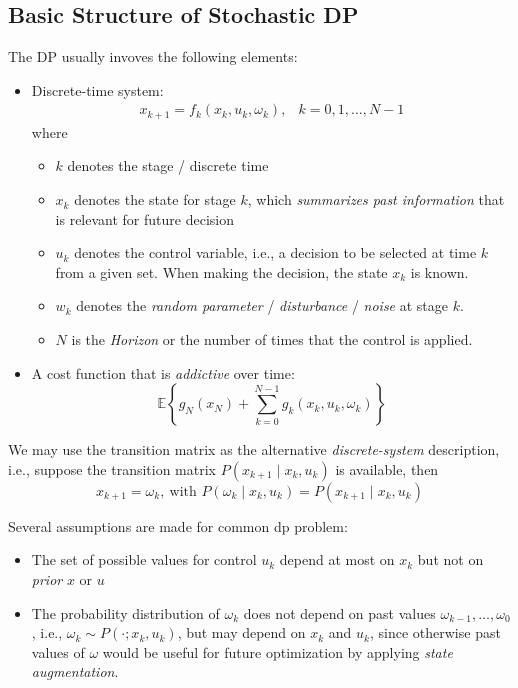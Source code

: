 \subsection{Basic Structure of Stochastic DP}
The DP usually invoves the following elements:
\begin{itemize}
\item
Discrete-time system:
\[
\begin{array}{ll}
x_{k+1} = f_k(x_k,u_k,\omega_k),&k=0,1,\dots,N-1
\end{array}
\]
where
\begin{itemize}
\item
$k$ denotes the stage / discrete time
\item
$x_k$ denotes the state for stage $k$, which \emph{summarizes past information} that is relevant for future decision
\item
$u_k$ denotes the control variable, i.e., a decision to be selected at time $k$ from a given set. When making the decision, the state $x_k$ is known.
\item
$w_k$ denotes the \emph{random parameter} / \emph{disturbance} / \emph{noise} at stage $k$.
\item
$N$ is the \emph{Horizon} or the number of times that the control is applied.
\end{itemize}
\item
A cost function that is \emph{addictive} over time:
\[
\mathbb{E}\left\{
g_N(x_N)
+
\sum_{k=0}^{N-1}g_k(x_k,u_k,\omega_k)
\right\}
\]
\end{itemize}
\begin{remark}
We may use the transition matrix as the alternative \emph{discrete-system} description, i.e., suppose the transition matrix $P(x_{k+1}\mid x_k,u_k)$ is available, then
\[
x_{k+1} = \omega_k,\ \text{with }
P(\omega_k\mid x_k,u_k) = P(x_{k+1}\mid x_k,u_k)
\]
\end{remark}
Several assumptions are made for common dp problem:
\begin{itemize}
\item
The set of possible values for control $u_k$ depend at most on $x_k$ but not on \emph{prior} $x$ or $u$
\item
The probability distribution of $\omega_k$ does not depend on past values $\omega_{k-1},\dots,\omega_0$, i.e., $\omega_k\sim P(\cdot ; x_k,u_k)$, but may depend on $x_k$ and $u_k$, since otherwise past values of $\omega$ would be useful for future optimization by applying \emph{state augmentation}.
\end{itemize}

